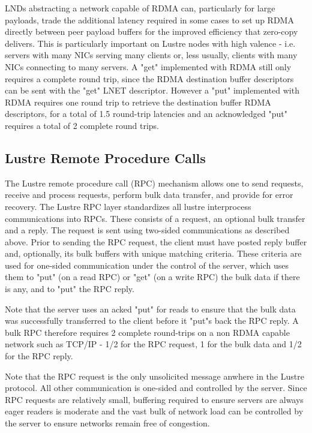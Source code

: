 \documentclass[]{sigplan-proc}
\begin{document}
\begin{figure}
\end{figure}

LNDs abstracting a network capable of RDMA can, particularly for large payloads, trade the additional latency
required in some cases to set up RDMA directly between peer payload buffers for the improved efficiency that
zero-copy delivers.  This is particularly important on Lustre nodes with high valence - i.e. servers with many
NICs serving many clients or, less usually, clients with many NICs connecting to many servers.  A "get"
implemented with RDMA still only requires a complete round trip, since the RDMA destination buffer descriptors
can be sent with the "get" LNET descriptor.  However a "put" implemented with RDMA requires one round trip to
retrieve the destination buffer RDMA descriptors, for a total of 1.5 round-trip latencies and an acknowledged
"put" requires a total of 2 complete round trips.

\begin{figure}
\end{figure}

\subsection{Lustre Remote Procedure Calls}

The Lustre remote procedure call (RPC) mechanism allows one to send requests, receive and process requests,
perform bulk data transfer, and provide for error recovery. The Lustre RPC layer standardizes all lustre
interprocess communications into RPCs.  These consists of a request, an optional bulk transfer and a
reply. The request is sent using two-sided communications as described above.  Prior to sending the RPC
request, the client must have posted reply buffer and, optionally, its bulk buffers with unique matching
criteria.  These criteria are used for one-sided communication under the control of the server, which uses
them to "put" (on a read RPC) or "get" (on a write RPC) the bulk data if there is any, and to "put" the RPC
reply.

Note that the server uses an acked "put" for reads to ensure that the bulk data was successfully transferred
to the client before it "put"s back the RPC reply.  A bulk RPC therefore requires 2 complete round-trips on a
non RDMA capable network such as TCP/IP - 1/2 for the RPC request, 1 for the bulk data and 1/2 for the RPC
reply.

Note that the RPC request is the only unsolicited message anwhere in the Lustre protocol.  All other
communication is one-sided and controlled by the server.  Since RPC requests are relatively small, buffering
required to ensure servers are always eager readers is moderate and the vast bulk of network load can be
controlled by the server to ensure networks remain free of congestion.
\end{document}
